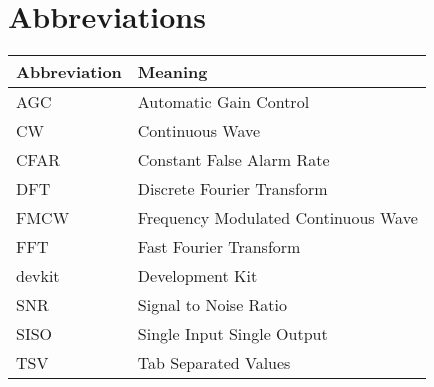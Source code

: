 
\chapter*{Abbreviations}


\begin{center}
  \begin{tabular}{| m{4cm}| m{9cm} | }
    \hline
		\textbf{Abbreviation} & \textbf{Meaning} \\
    \hline
    \hline
		AGC & Automatic Gain Control \\
		CW & Continuous Wave \\
		CFAR & Constant False Alarm Rate \\
		DFT & Discrete Fourier Transform \\
		FMCW & Frequency Modulated Continuous Wave \\
		FFT & Fast Fourier Transform \\
		devkit & Development Kit \\
		SNR & Signal to Noise Ratio \\
		SISO & Single Input Single Output \\
		TSV & Tab Separated Values \\
    \hline
  \end{tabular}

\end{center}
